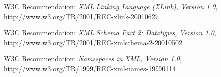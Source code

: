 \documentclass{article}
\begin{document}
\begin{thebibliography}{ABCDE99}
 W3C Recommendation: \textit{XML Linking Language
  (XLink), Version 1.0},
  \href{http://www.w3.org/TR/2001/REC-xlink-20010627}
       {http://www.w3.org/TR/2001/REC-xlink-20010627}

 W3C Recommendation: \textit{XML Schema Part 2:
  Datatypes, Version 1.0},
  \href{http://www.w3.org/TR/2001/REC-xmlschema-2-20010502}
       {http://www.w3.org/TR/2001/REC-xmlschema-2-20010502}

 W3C Recommendation: \textit{Namespaces in XML,
  Version 1.0},
  \href{http://www.w3.org/TR/1999/REC-xml-names-19990114}
       {http://www.w3.org/TR/1999/REC-xml-names-19990114}

\end{thebibliography}
\end{document}
